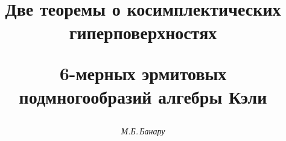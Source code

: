 









\newcommand{\la}{\langle}


\newcommand{\ra}{\rangle}


\newcommand{\tts}[1]{}







\setcounter{page}{9}















\author{\it М.Б.\,Банару}




\title{Две теоремы о косимплектических гиперповерхностях


6-мерных эрмитовых подмногообразий алгебры Кэли}





\date{}




\pagestyle{plain} %







\maketitle


